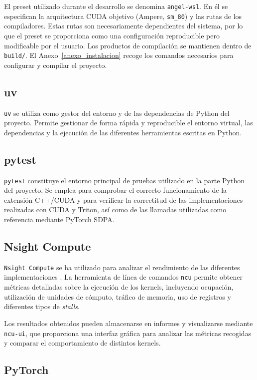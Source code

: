 El preset utilizado durante el desarrollo se denomina \texttt{angel-wsl}. En él se especifican la arquitectura CUDA objetivo (Ampere, \texttt{sm\_80}) y las rutas de los compiladores. Estas rutas son necesariamente dependientes del sistema, por lo que el preset se proporciona como una configuración reproducible pero modificable por el usuario. Los productos de compilación se mantienen dentro de \texttt{build/}. El Anexo~\ref{anexo_instalacion} recoge los comandos necesarios para configurar y compilar el proyecto.

\subsection{uv}

\texttt{uv} se utiliza como gestor del entorno y de las dependencias de Python del proyecto. Permite gestionar de forma rápida y reproducible el entorno virtual, las dependencias y la ejecución de las diferentes herramientas escritas en Python.

\subsection{pytest}

\texttt{pytest} constituye el entorno principal de pruebas utilizado en la parte Python del proyecto. Se emplea para comprobar el correcto funcionamiento de la extensión C++/CUDA y para verificar la correctitud de las implementaciones realizadas con CUDA y Triton, así como de las llamadas utilizadas como referencia mediante PyTorch SDPA.

\subsection{Nsight Compute}

\texttt{Nsight Compute} se ha utilizado para analizar el rendimiento de las diferentes implementaciones \cite{nsightCompute}. La herramienta de línea de comandos \texttt{ncu} permite obtener métricas detalladas sobre la ejecución de los kernels, incluyendo ocupación, utilización de unidades de cómputo, tráfico de memoria, uso de registros y diferentes tipos de \textit{stalls}.

Los resultados obtenidos pueden almacenarse en informes y visualizarse mediante \texttt{ncu-ui}, que proporciona una interfaz gráfica para analizar las métricas recogidas y comparar el comportamiento de distintos kernels.

\subsection{PyTorch}

